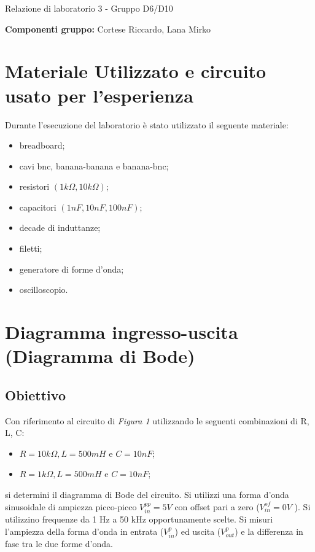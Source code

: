 \documentclass{article}
\begin{document}
\justifying

\begin{center}
    {\fontsize{36}{43.2}\selectfont Relazione di laboratorio 3 - Gruppo D6/D10}
\end{center}
\noindent
\textbf{Componenti gruppo:} Cortese Riccardo, Lana Mirko

\section*{Materiale Utilizzato e circuito usato per l'esperienza}

Durante l'esecuzione del laboratorio è stato utilizzato il seguente materiale:
\begin{itemize}
    \item breadboard;
    \item cavi bnc, banana-banana e banana-bnc;
    \item resistori \((1k\Omega, 10k\Omega)\);
    \item capacitori \((1nF, 10nF, 100nF)\);
    \item decade di induttanze;
    \item filetti;
    \item generatore di forme d'onda;
    \item oscilloscopio.
\end{itemize}



\section{Diagramma ingresso-uscita (Diagramma di Bode)}

\subsection{Obiettivo}
Con riferimento al circuito di \textit{Figura 1} utilizzando le seguenti combinazioni di R, L, C:
\begin{itemize}
    \item $R = 10 k\Omega, L = 500 mH$ e $C = 10 nF$;
    \item $R = 1 k\Omega, L = 500 mH$ e $C = 10 nF$;
\end{itemize}

si determini il diagramma di Bode del circuito. Si utilizzi una forma d'onda sinusoidale di ampiezza picco-picco $V_{in}^{pp} = 5 V$ con offset pari a zero ($V_{in}^{of} = 0 V$ ). Si utilizzino frequenze da 1 Hz a 50 kHz opportunamente scelte. Si misuri l'ampiezza della forma d'onda in entrata ($V_{in}^{p}$) ed uscita ($V_{out}^{p}$) e la differenza in fase tra le due forme d'onda. 
\end{document}
